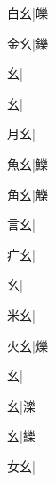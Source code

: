 \begin{multicols}{2}
{{\cjk{}{\cnsym{}　}白幺}|{\cjk{}皪}\par
{\cjk{}{\cnsym{}　}金幺}|{\cjk{}鑠}\par
{幺}|{}\par
{幺}|{}\par
{\cjk{}{\cnsym{}　}月幺}|{}\par
{\cjk{}{\cnsym{}　}魚幺}|{\cjk{}鱳}\par
{\cjk{}{\cnsym{}　}角幺}|{\cjk{}觻}\par
{\cjk{}{\cnsym{}　}言幺}|{}\par
{\cjk{}{\cnsym{}　}疒幺}|{}\par
{幺}|{}\par
{\cjk{}{\cnsym{}　}米幺}|{}\par
{\cjk{}{\cnsym{}　}火幺}|{\cjk{}爍}\par
{幺}|{}\par
{幺}|{\cjk{}濼}\par
{幺}|{\cjk{}纅}\par
{\cjk{}{\cnsym{}　}女幺}|{}\par
}
\end{multicols}
